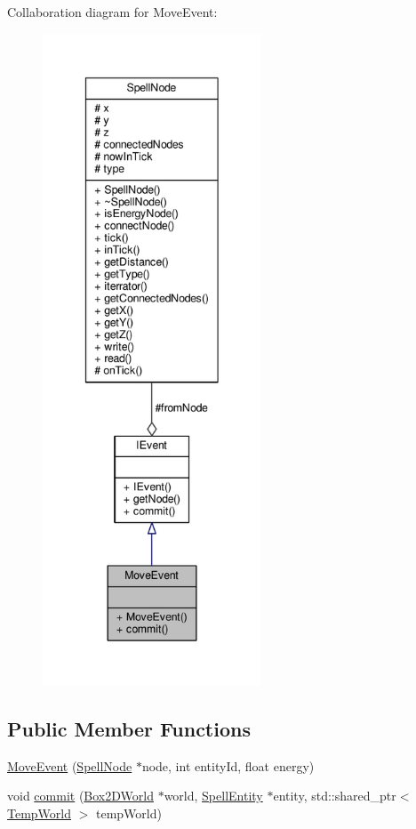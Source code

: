 Collaboration diagram for Move\-Event\-:
\nopagebreak
\begin{figure}[H]
\begin{center}
\leavevmode
\includegraphics[height=550pt]{class_move_event__coll__graph}
\end{center}
\end{figure}
\subsection*{Public Member Functions}
\begin{DoxyCompactItemize}
\item 
\hyperlink{class_move_event_a21918c04e0050401e1334b9001604cc6}{Move\-Event} (\hyperlink{class_spell_node}{Spell\-Node} $\ast$node, int entity\-Id, float energy)
\item 
void \hyperlink{class_move_event_a409faa8726fad01a66fe86d61369fcaf}{commit} (\hyperlink{class_box2_d_world}{Box2\-D\-World} $\ast$world, \hyperlink{class_spell_entity}{Spell\-Entity} $\ast$entity, std\-::shared\-\_\-ptr$<$ \hyperlink{_server_8hpp_ac147588bd69e1d052194e0dea10202ff}{Temp\-World} $>$ temp\-World)
\end{DoxyCompactItemize}
